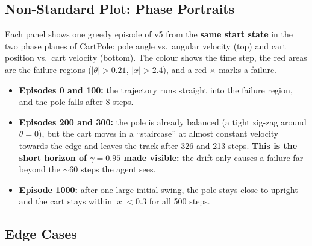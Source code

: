 \subsection{Non-Standard Plot: Phase Portraits}

Each panel shows one greedy episode of v5 from the \textbf{same start state} in the two phase planes of CartPole: pole angle vs.\ angular velocity (top) and cart position vs.\ cart velocity (bottom). The colour shows the time step, the red areas are the failure regions ($|\theta| > 0.21$, $|x| > 2.4$), and a red $\times$ marks a failure.


\begin{itemize}
  \item \textbf{Episodes 0 and 100:} the trajectory runs straight into the failure region, and the pole falls after 8 steps.
  \item \textbf{Episodes 200 and 300:} the pole is already balanced (a tight zig-zag around $\theta = 0$), but the cart moves in a ``staircase'' at almost constant velocity towards the edge and leaves the track after 326 and 213 steps. \textbf{This is the short horizon of $\gamma = 0.95$ made visible:} the drift only causes a failure far beyond the $\sim$60 steps the agent sees.
  \item \textbf{Episode 1000:} after one large initial swing, the pole stays close to upright and the cart stays within $|x| < 0.3$ for all 500 steps.
\end{itemize}

\subsection{Edge Cases}

